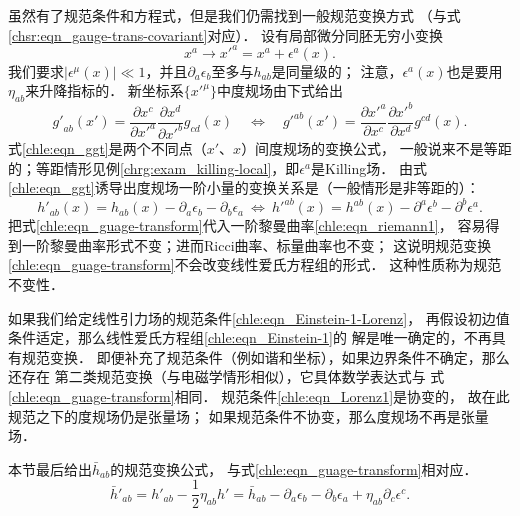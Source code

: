 虽然有了规范条件和方程式，但是我们仍需找到一般规范变换方式
（与式\eqref{chsr:eqn_gauge-trans-covariant}对应）．
设有局部微分同胚无穷小变换
\begin{equation}
    x^a\to x'^{a}=x^a + \epsilon^a(x).
\end{equation}
我们要求$|\epsilon^\mu(x)|\ll 1$，并且$\partial_a\epsilon_b$至多与$h_{ab}$是同量级的；
注意，$\epsilon^a(x)$也是要用$\eta_{ab}$来升降指标的．
新坐标系$\{x'^\mu\}$中度规场由下式给出
\begin{equation}\label{chle:eqn_ggt}
    {g'}_{ab}(x')=\frac{\partial x^c}{\partial x'^a}
    \frac{\partial x^d}{\partial x'^b} g_{cd}(x)
    \quad \Leftrightarrow \quad
    {g'}^{ab}(x')=\frac{\partial x'^a}{\partial x^c}
    \frac{\partial x'^b}{\partial x^d} g^{cd}(x) .
\end{equation}
式\eqref{chle:eqn_ggt}是两个不同点（$x'$、$x$）间度规场的变换公式，
一般说来不是等距的；等距情形见例\ref{chrg:exam_killing-local}，即$\epsilon^a$是Killing场．
由式\eqref{chle:eqn_ggt}诱导出{\kaishu 度规场一阶小量}的变换关系是（一般情形是非等距的）：
\begin{equation}\label{chle:eqn_guage-transform}
    {h'}_{ab}(x)={h}_{ab}(x) -\partial_a \epsilon_b - \partial_b \epsilon_a
    \ \Leftrightarrow \
    {h'}^{ab}(x)={h}^{ab}(x) -\partial^a \epsilon^b - \partial^b \epsilon^a .
\end{equation}
把式\eqref{chle:eqn_guage-transform}代入一阶黎曼曲率\eqref{chle:eqn_riemann1}，
容易得到一阶黎曼曲率形式不变；进而Ricci曲率、标量曲率也不变；
这说明规范变换\eqref{chle:eqn_guage-transform}不会改变线性爱氏方程组的形式．
这种性质称为{\heiti 规范不变性}．



如果我们给定线性引力场的规范条件\eqref{chle:eqn_Einstein-1-Lorenz}，
再假设初边值条件适定，那么线性爱氏方程组\eqref{chle:eqn_Einstein-1}的
解是唯一确定的，不再具有规范变换．
即便补充了规范条件（例如谐和坐标），如果边界条件不确定，那么还存在
第二类规范变换（与电磁学情形相似），它具体数学表达式与
式\eqref{chle:eqn_guage-transform}相同．
规范条件\eqref{chle:eqn_Lorenz1}是协变的，
故在此规范之下的度规场仍是张量场；
如果规范条件不协变，那么度规场不再是张量场．

本节最后给出$\bar{h}_{ab}$的规范变换公式，
与式\eqref{chle:eqn_guage-transform}相对应．
\begin{equation}\label{chle:eqn_guage-transform-hbar}
        \bar{h}'_{ab}= {h'}_{ab} - \frac{1}{2}\eta_{ab} h'
    =\bar{h}_{ab} -\partial_a \epsilon_b - \partial_b \epsilon_a
     +\eta_{ab}\partial_c \epsilon^c .
\end{equation}


